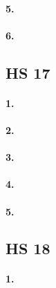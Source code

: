 \documentclass[
]{article}
\begin{document}
\hypertarget{section-85}{%
\paragraph{\texorpdfstring{\textbf{5.}}{5.}}\label{section-85}}

\hypertarget{section-86}{%
\paragraph{\texorpdfstring{\textbf{6.}}{6.}}\label{section-86}}

\hypertarget{hs-17}{%
\subsection{HS 17}\label{hs-17}}

\hypertarget{section-87}{%
\paragraph{\texorpdfstring{\textbf{1.}}{1.}}\label{section-87}}

\hypertarget{section-88}{%
\paragraph{\texorpdfstring{\textbf{2.}}{2.}}\label{section-88}}

\hypertarget{section-89}{%
\paragraph{\texorpdfstring{\textbf{3.}}{3.}}\label{section-89}}

\hypertarget{section-90}{%
\paragraph{\texorpdfstring{\textbf{4.}}{4.}}\label{section-90}}

\hypertarget{section-91}{%
\paragraph{\texorpdfstring{\textbf{5.}}{5.}}\label{section-91}}

\hypertarget{hs-18}{%
\subsection{HS 18}\label{hs-18}}

\hypertarget{section-92}{%
\paragraph{\texorpdfstring{\textbf{1.}}{1.}}\label{section-92}}
\end{document}

